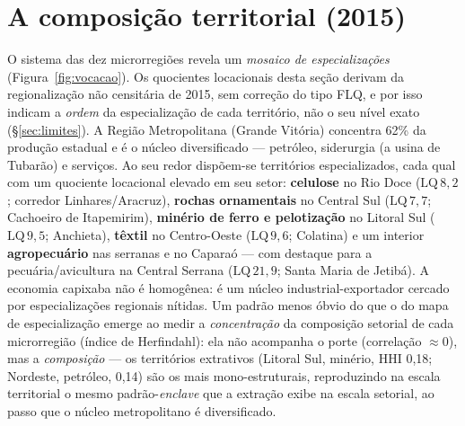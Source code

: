 \documentclass[11pt,a4paper]{article}
\begin{document}
\section{A composição territorial (2015)}
\label{sec:territorio}
O sistema das dez microrregiões revela um \emph{mosaico de especializações}
(Figura~\ref{fig:vocacao}). Os quocientes locacionais desta seção derivam da regionalização
não censitária de 2015, sem correção do tipo FLQ, e por isso indicam a \emph{ordem} da
especialização de cada território, não o seu nível exato (\S\ref{sec:limites}).
A Região Metropolitana (Grande Vitória) concentra 62\% da
produção estadual e é o núcleo diversificado --- petróleo, siderurgia (a usina de
Tubarão) e serviços. Ao seu redor dispõem-se territórios especializados, cada qual com um
quociente locacional elevado em seu setor: \textbf{celulose} no Rio Doce
($\mathrm{LQ}\,8{,}2$; corredor Linhares/Aracruz), \textbf{rochas ornamentais} no
Central Sul ($\mathrm{LQ}\,7{,}7$; Cachoeiro de Itapemirim), \textbf{minério de ferro e
pelotização} no Litoral Sul ($\mathrm{LQ}\,9{,}5$; Anchieta), \textbf{têxtil} no
Centro-Oeste ($\mathrm{LQ}\,9{,}6$; Colatina) e um interior \textbf{agropecuário} nas
serranas e no Caparaó --- com destaque para a pecuária/avicultura na Central Serrana
($\mathrm{LQ}\,21{,}9$; Santa Maria de Jetibá). A economia capixaba não é homogênea: é
um núcleo industrial-exportador cercado por especializações regionais nítidas.
Um padrão menos óbvio do que o do mapa de especialização emerge ao medir a
\emph{concentração} da composição setorial de cada microrregião (índice de Herfindahl): ela
não acompanha o porte (correlação $\approx0$), mas a \emph{composição} --- os territórios
extrativos (Litoral Sul, minério, HHI 0,18; Nordeste, petróleo, 0,14) são os mais
mono-estruturais, reproduzindo na escala territorial o mesmo padrão-\emph{enclave} que a
extração exibe na escala setorial, ao passo que o núcleo metropolitano é diversificado.
\end{document}
